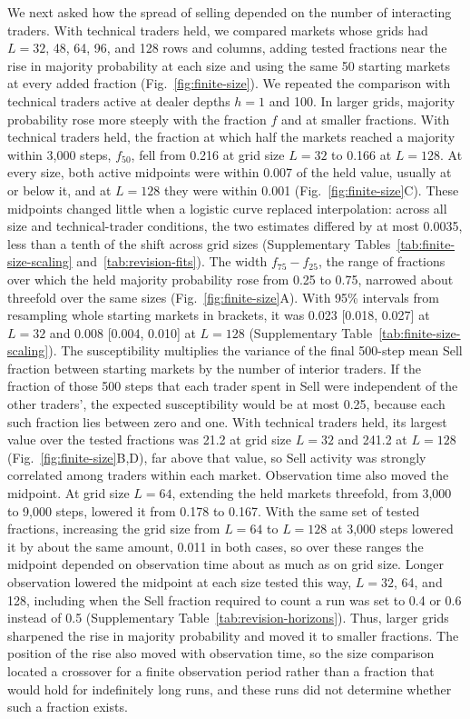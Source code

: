 We next asked how the spread of selling depended on the number of
interacting traders. With technical traders held, we compared markets
whose grids had $L=32$, 48, 64, 96, and 128 rows and columns, adding
tested fractions near the rise in majority probability at each size and
using the same 50 starting markets at every added fraction
(Fig.~\ref{fig:finite-size}). We repeated the comparison with technical
traders active at dealer depths $h=1$ and 100. In larger grids, majority
probability rose more steeply with the fraction $f$ and at smaller
fractions. With technical traders held, the fraction at which half the
markets reached a majority within 3,000 steps, $f_{50}$, fell from 0.216
at grid size $L=32$ to 0.166 at $L=128$. At every size, both active
midpoints were within 0.007 of the held value, usually at or below it,
and at $L=128$ they were within 0.001
(Fig.~\ref{fig:finite-size}C). These midpoints changed little when a
logistic curve replaced interpolation: across all size and
technical-trader conditions, the two estimates differed by at most
0.0035, less than a tenth of the shift across grid sizes
(Supplementary Tables~\ref{tab:finite-size-scaling} and~\ref{tab:revision-fits}).
The width $f_{75}-f_{25}$, the range of fractions over which the held
majority probability rose from 0.25 to 0.75, narrowed about threefold
over the same sizes (Fig.~\ref{fig:finite-size}A). With 95\% intervals
from resampling whole starting markets in brackets, it was
0.023 [0.018, 0.027] at $L=32$ and 0.008 [0.004, 0.010] at $L=128$
(Supplementary Table~\ref{tab:finite-size-scaling}).
The susceptibility multiplies the variance of the final 500-step mean
Sell fraction between starting markets by the number of interior
traders. If the fraction of those 500 steps that each trader spent in
Sell were independent of the other traders', the expected susceptibility
would be at most 0.25, because each such fraction lies between zero and
one. With technical traders
held, its largest value over the tested fractions was 21.2 at grid size
$L=32$ and 241.2 at $L=128$ (Fig.~\ref{fig:finite-size}B,D), far above
that value, so Sell activity was strongly correlated among traders
within each market. Observation
time also moved the midpoint. At grid size $L=64$, extending the held
markets threefold, from 3,000 to 9,000 steps, lowered it from 0.178 to
0.167. With the same set of tested fractions, increasing the grid size from $L=64$
to $L=128$ at 3,000 steps lowered it by about the same amount, 0.011 in
both cases, so over these ranges the midpoint depended on observation
time about as much as on grid size. Longer observation lowered the midpoint at each size tested this
way, $L=32$, 64, and 128, including when the Sell fraction required to
count a run was set to 0.4 or 0.6 instead of 0.5
(Supplementary Table~\ref{tab:revision-horizons}). Thus, larger grids
sharpened the rise in majority probability and moved it to smaller
fractions. The position of the rise also moved with observation time,
so the size
comparison located a crossover for a finite observation period rather than a fraction that would hold for indefinitely long runs, and
these runs did not determine whether such a fraction exists.
